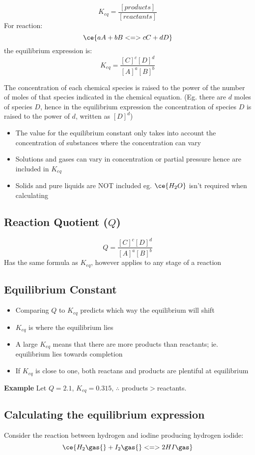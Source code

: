 	$$K_{eq} = \frac{[products]}{[reactants]}$$
	For reaction:
	$$\ce{aA + bB <=> cC + dD}$$
	the equilibrium expression is:
	$$K_{eq}=\frac{[C]^{c}[D]^{d}}{[A]^a[B]^b}$$

	The concentration of each chemical species is raised to the power of the number of moles of that species indicated in the chemical equation. (Eg. there are $d$ moles of species $D$, hence in the equilibrium expression the concentration of species $D$ is raised to the power of $d$, written as $[D]^d$)

	\begin{itemize}
		\item The value for the equilibrium constant only takes into account the concentration of substances where the concentration can vary
		\item Solutions and gases can vary in concentration or partial pressure hence are included in $K_{eq}$
		\item Solids and pure liquids are NOT included eg. $\ce{H_2O}$ isn't required when calculating
	\end{itemize}

	\subsection{Reaction Quotient ($Q$)}
		$$Q=\frac{[C]^{c}[D]^{d}}{[A]^a[B]^b}$$
		Has the same formula as $K_{eq}$, however applies to any stage of a reaction
		
	\subsection{Equilibrium Constant}
		\begin{itemize}
			\item Comparing $Q$ to $K_{eq}$ predicts which way the equilibrium will shift
			\item $K_{eq}$ is where the equilibrium lies
			\item A large $K_{eq}$ means that there are more products than reactants; ie. equilibrium lies towards completion
			\item If $K_{eq}$ is close to one, both reactans and products are plentiful at equilibrium
		\end{itemize}
		\textbf{Example} Let $Q=2.1$, $K_{eq}=0.315$, $\therefore$ products$>$reactants.

	\subsection{Calculating the equilibrium expression}
		Consider the reaction between hydrogen and iodine producing hydrogen iodide:
		$$\ce{H_{2}\gas{} + I_{2}\gas{} <=> 2HI\gas}$$

